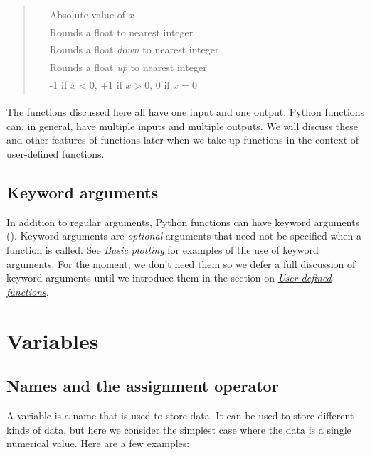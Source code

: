 \documentclass[letterpaper,10pt,english]{sphinxmanual}
\begin{document}
\begin{quote}
\begin{tabulary}{\linewidth}{|L|L|}
 & 
Absolute value of \(x\)
\\

 & 
Rounds a float to nearest integer
\\

 & 
Rounds a float \emph{down} to nearest integer
\\

 & 
Rounds a float \emph{up} to nearest integer
\\

 & 
-1 if \(x<0\), +1 if \(x>0\), 0 if \(x=0\)
\\
\hline\end{tabulary}

\end{quote}

The functions discussed here all have one input and one output.  Python functions can, in general, have multiple inputs and multiple outputs.  We will discuss these and other features of functions later when we take up functions in the context of user-defined functions.


\subsection{Keyword arguments}
\label{chap2/chap2_basics:keyword-arguments}
In addition to regular arguments, Python functions can have keyword arguments ().  Keyword arguments are \emph{optional} arguments that need not be specified when a function is called.  See {\hyperref[chap5/chap5_plot:chap5basicplotting]{\emph{Basic plotting}}} for examples of the use of keyword arguments.  For the moment, we don't need them so we defer a full discussion of keyword arguments until we introduce them in the section on {\hyperref[chap7/chap7_funcs:userdefdfuncs]{\emph{User-defined functions}}}.


\section{Variables}
\label{chap2/chap2_basics:variables}

\subsection{Names and the assignment operator}
\label{chap2/chap2_basics:names-and-the-assignment-operator}
A variable is a name that is used to store data.  It can be used to store different kinds of data, but here we consider the simplest case where the data is a single numerical value.  Here are a few examples:
\end{document}
